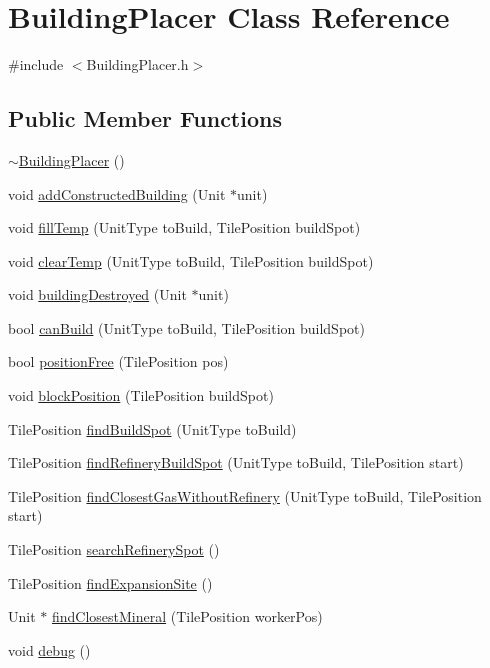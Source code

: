 \hypertarget{class_building_placer}{\section{Building\-Placer Class Reference}
\label{class_building_placer}
}


{\ttfamily \#include $<$Building\-Placer.\-h$>$}

\subsection*{Public Member Functions}
\begin{DoxyCompactItemize}
\item 
\hyperlink{class_building_placer_a39cbfd26c073e97cdee689eacd20320b}{$\sim$\-Building\-Placer} ()
\item 
void \hyperlink{class_building_placer_a4db062e35b219e14c7d4f28ddf379c2e}{add\-Constructed\-Building} (Unit $\ast$unit)
\item 
void \hyperlink{class_building_placer_ad2dfe73b7517df3f631e17143fce55e2}{fill\-Temp} (Unit\-Type to\-Build, Tile\-Position build\-Spot)
\item 
void \hyperlink{class_building_placer_a0ca47382cf0aede49eb1b0e03d963cb7}{clear\-Temp} (Unit\-Type to\-Build, Tile\-Position build\-Spot)
\item 
void \hyperlink{class_building_placer_a111eae9e5619a6596e7639794ff747c1}{building\-Destroyed} (Unit $\ast$unit)
\item 
bool \hyperlink{class_building_placer_a1a10a22321df1272cbd2a219d33917b0}{can\-Build} (Unit\-Type to\-Build, Tile\-Position build\-Spot)
\item 
bool \hyperlink{class_building_placer_a6e6aac0e69a0d5867a096592f1461583}{position\-Free} (Tile\-Position pos)
\item 
void \hyperlink{class_building_placer_a2c5196cdc6100a9edfbb8dfe5c269547}{block\-Position} (Tile\-Position build\-Spot)
\item 
Tile\-Position \hyperlink{class_building_placer_ab4b1089411f9e9b63aa38272254cd45e}{find\-Build\-Spot} (Unit\-Type to\-Build)
\item 
Tile\-Position \hyperlink{class_building_placer_a3f4453346b91cffd94d0f6a222354b98}{find\-Refinery\-Build\-Spot} (Unit\-Type to\-Build, Tile\-Position start)
\item 
Tile\-Position \hyperlink{class_building_placer_af49a205210ab9be0eea8e71b26e74d46}{find\-Closest\-Gas\-Without\-Refinery} (Unit\-Type to\-Build, Tile\-Position start)
\item 
Tile\-Position \hyperlink{class_building_placer_ab93603c0d38b2931ac3bc1bbbc7a6eb4}{search\-Refinery\-Spot} ()
\item 
Tile\-Position \hyperlink{class_building_placer_a7643036b356e9254c2ec0d9b880b78d8}{find\-Expansion\-Site} ()
\item 
Unit $\ast$ \hyperlink{class_building_placer_ac527f9a42f1f01f8778d8c5e5321ebe0}{find\-Closest\-Mineral} (Tile\-Position worker\-Pos)
\item 
void \hyperlink{class_building_placer_a37c25fb0416548b40ad8317445cc9e90}{debug} ()
\end{DoxyCompactItemize}
